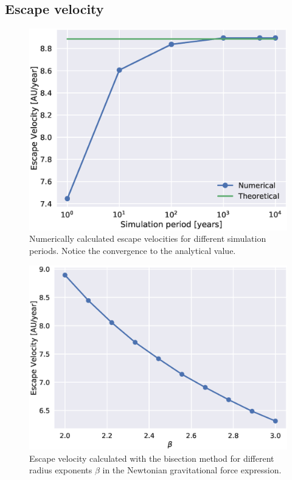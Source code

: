 \documentclass[aps,reprint]{revtex4-1}
\begin{document}
\subsection{Escape velocity}

\begin{figure}[H]
  \includegraphics[width=\columnwidth]{figures/escapevelocity.eps}
  \caption{Numerically calculated escape velocities for different simulation
  periods. Notice the convergence to the analytical value.}
  \label{fig:escvel}
\end{figure}

\begin{figure}[H]
  \includegraphics[width=\columnwidth]{figures/escapevelocitybeta.eps}
  \caption{Escape velocity calculated with the bisection method for different
  radius exponents $\beta$ in the Newtonian gravitational force expression.}
  \label{fig:hei}
\end{figure}
\end{document}
